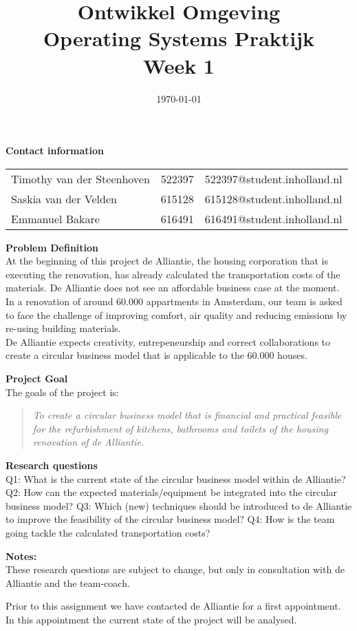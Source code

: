 \documentclass[11pt]{article}
\title{\Large \textbf{Ontwikkel Omgeving}\\ Operating Systems Praktijk \\ \large Week 1}
\author{}
\date{\today}
\begin{document}
	\textbf{Contact information}
	\begin{table}[H]
		\centering
		\begin{tabular}{l c c}
			Timothy van der Steenhoven & 522397 & 522397@student.inholland.nl\\
			Saskia van der Velden & 615128 & 615128@student.inholland.nl\\
			Emmanuel Bakare & 616491 & 616491@student.inholland.nl\\
		\end{tabular}
	\end{table}


\textbf{Problem Definition}\\
At the beginning of this project de Alliantie, the housing corporation that is executing the renovation, has already calculated the transportation costs of the materials. De Alliantie does not see an affordable business case at the moment.\\

In a renovation of around 60.000 appartments in Amsterdam, our team is asked to face the challenge of improving comfort, air quality and reducing emissions by re-using building materials.\\

De Alliantie expects creativity, entrepeneurship and correct collaborations to create a circular business model that is applicable to the 60.000 houses.

\textbf{Project Goal}\\
The goals of the project is: \\
\blockquote{\textit{To create a circular business model that is financial and practical feasible for the refurbishment of kitchens, bathrooms and toilets of the housing renovation of de Alliantie.}}

\textbf{Research questions}\\
Q1: What is the current state of the circular business model within de Alliantie?
Q2: How can the expected materials/equipment be integrated into the circular business model?
Q3: Which (new) techniques should be introduced to de Alliantie to improve the feasibility of the circular business model?
Q4: How is the team going tackle the calculated transportation costs?

\textbf{Notes:}\\
These research questions are subject to change, but only in consultation with de Alliantie and the team-coach.

Prior to this assignment we have contacted de Alliantie for a first appointment. In this appointment the current state of the project will be analysed.
\end{document}
